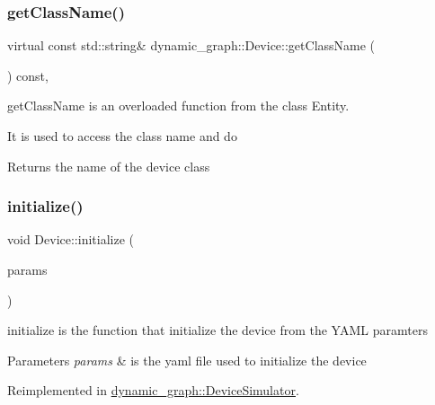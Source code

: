 \subsubsection{\texorpdfstring{get\+Class\+Name()}{getClassName()}}
{\footnotesize\ttfamily virtual const std\+::string\& dynamic\+\_\+graph\+::\+Device\+::get\+Class\+Name (\begin{DoxyParamCaption}\item[{void}]{ }\end{DoxyParamCaption}) const\hspace{0.3cm}{\ttfamily [inline]}, {\ttfamily [virtual]}}



get\+Class\+Name is an overloaded function from the class Entity. 

It is used to access the class name and do \begin{DoxyReturn}{Returns}
the name of the device class 
\end{DoxyReturn}
\mbox{\label{classdynamic__graph_1_1Device_af6edd01afac2838c4e336c76caa4338a}} 
\subsubsection{\texorpdfstring{initialize()}{initialize()}}
{\footnotesize\ttfamily void Device\+::initialize (\begin{DoxyParamCaption}\item[{const Y\+A\+M\+L\+::\+Node \&}]{params }\end{DoxyParamCaption})\hspace{0.3cm}{\ttfamily [virtual]}}



initialize is the function that initialize the device from the Y\+A\+ML paramters 


\begin{DoxyParams}{Parameters}
{\em params} & is the yaml file used to initialize the device \\
\hline
\end{DoxyParams}


Reimplemented in \hyperlink{classdynamic__graph_1_1DeviceSimulator_a346995902653feca7707f8c62ab4bf95}{dynamic\+\_\+graph\+::\+Device\+Simulator}.

\mbox{\label{classdynamic__graph_1_1Device_af71d151e69555e9530d770d3d90b7f3e}} 
